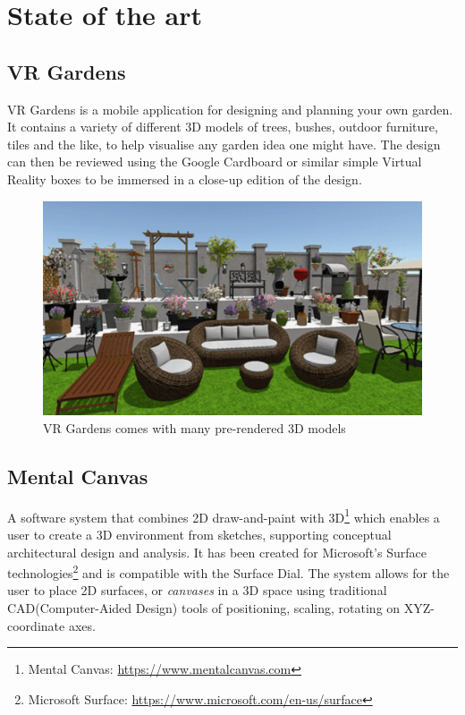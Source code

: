     \section{State of the art}\label{sec:SOTA}
		
		\subsection{VR Gardens}
			VR Gardens is a mobile application for designing and planning your own garden. It contains a variety of different 3D models of trees, bushes, outdoor furniture, tiles and the like, to help visualise any garden idea one might have. The design can then be reviewed using the Google Cardboard or similar simple Virtual Reality boxes to be immersed in a close-up edition of the design.
			\begin{figure}[H]
				\centering
				\includegraphics[width=0.6\linewidth]{figure/Analysis/vrgardens}
				\caption{VR Gardens comes with many pre-rendered 3D models}
				\label{fig:vrgardens}
			\end{figure}
			
		\subsection{Mental Canvas}
			A software system that combines 2D draw-and-paint with 3D\footnote{Mental Canvas: \url{https://www.mentalcanvas.com}} which enables a user to create a 3D environment from sketches, supporting conceptual architectural design and analysis. It has been created for Microsoft's Surface technologies\footnote{Microsoft Surface: \url{https://www.microsoft.com/en-us/surface}} and is compatible with the Surface Dial. The system allows for the user to place 2D surfaces, or \textit{canvases} in a 3D space using traditional CAD(Computer-Aided Design) tools of positioning, scaling, rotating on XYZ-coordinate axes.\cite{sotaMentalCanvas}
			
